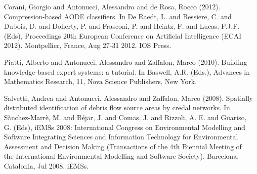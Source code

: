 \begin{cventries}
\begin{cvitems}
\item Corani, Giorgio and Antonucci, Alessandro and de Rosa, Rocco (2012).   Compression-based AODE classifiers.   In De Raedt, L. and Bessiere, C. and Dubois, D. and Doherty, P. and Frasconi, P. and Heintz, F. and Lucas, P.J.F. (Eds), Proceedings 20th European Conference on Artificial Intelligence (ECAI 2012).   Montpellier, France,   Aug 27-31 2012.   IOS Press.
\item Piatti, Alberto and Antonucci, Alessandro and Zaffalon, Marco (2010).   Building knowledge-based expert systems: a tutorial.   In Baswell, A.R. (Eds.), Advances in Mathematics Research, 11, Nova Science Publishers, New York.
\item Salvetti, Andrea and Antonucci, Alessandro and Zaffalon, Marco (2008).   Spatially distributed identification of debris flow source areas by credal networks.   In Sànchez-Marrè, M. and Béjar, J. and Comas, J. and Rizzoli, A. E. and Guariso, G. (Eds), iEMSs 2008: International Congress on Environmental Modelling and Software Integrating Sciences and Information Technology for Environmental Assessment and Decision Making (Transactions of the 4th Biennial Meeting of the International Environmental Modelling and Software Society).   Barcelona, Catalonia,   Jul 2008.   iEMSs.
\end{cvitems}
\end{cventries}
\vskip 2mm
